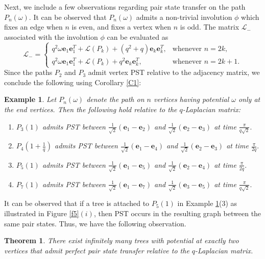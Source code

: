 \documentclass[12pt,a4paper]{article}
\newtheorem{thm}{Theorem}
\newtheorem{exm}{Example}
\def \e {{\mathbf e}}
\newcommand{\ob}[1]{\left(#1\right)}
\begin{document}
Next, we include a few observations regarding pair state transfer on the path $P_n(\omega)$. It can be observed that $P_n(\omega)$ admits a non-trivial involution $\phi$ which fixes an edge when $n$ is even, and fixes a vertex when $n$ is odd. The matrix $\mathscr{L}_-$ associated with the involution $\phi$ can be evaluated as 
$$\mathscr{L}_{-} =\begin{cases}
    q^2\omega\e_1\e_1^T+\mathscr{L}(P_k)+(q^2+q)\e_k\e_k^T, & \text{whenever } n=2k,\\
    q^2\omega\e_1\e_1^T+\mathscr{L}(P_k)+q^2\e_k\e_k^T, &\text{whenever } n=2k+1.
\end{cases}$$
Since the paths $P_2$ and $P_3$ admit vertex PST relative to the adjacency matrix, we conclude the following using Corollary \ref{C1}:
\begin{exm}\label{Ex2}
Let $P_n(\omega)$ denote the path on $n$ vertices having potential $\omega$ only at the end vertices. Then the following hold relative to the $q$-Laplacian matrix:
\begin{enumerate}
\item $P_3(1)$ admits PST between $\frac{1}{\sqrt{2}}(\e_1-\e_2)$ and $\frac{1}{\sqrt{2}}(\e_2-\e_3)$ at time $\frac{\pi}{q\sqrt{2}}.$ 
\item $P_4\ob{1+\frac{1}{q}}$ admits PST between $\frac{1}{\sqrt{2}}(\e_1-\e_4)$ and $\frac{1}{\sqrt{2}}(\e_2-\e_3)$ at time $\frac{\pi}{2q}.$
\item $P_5(1)$ admits PST between $\frac{1}{\sqrt{2}}(\e_1-\e_5)$ and $\frac{1}{\sqrt{2}}(\e_2-\e_4)$ at time $\frac{\pi}{2q}.$
\item $P_7(1)$ admits PST between $\frac{1}{\sqrt{2}}(\e_1-\e_7)$ and $\frac{1}{\sqrt{2}}(\e_3-\e_5)$ at time $\frac{\pi}{q\sqrt{2}}.$
\end{enumerate}
\end{exm}
It can be observed that if a tree is attached to $P_5(1)$ in Example \ref{Ex2}(3) as illustrated in Figure \ref{f5}$(i)$, then PST occurs in the resulting graph between the same pair states. Thus, we have the following observation.
\begin{thm}
There exist infinitely many trees with potential at exactly two vertices that admit perfect pair state transfer relative to the $q$-Laplacian matrix.    
\end{thm}
\end{document}

